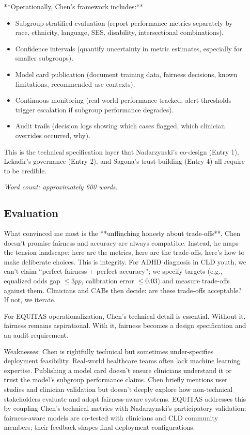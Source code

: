 \documentclass[12pt,twoside]{article}
\DeclareRobustCommand{\pp}{pp\xspace}
\begin{document}
**Operationally, Chen's framework includes:**

\begin{itemize}
\item Subgroup-stratified evaluation (report performance metrics separately by race, ethnicity, language, SES, disability, intersectional combinations).
\item Confidence intervals (quantify uncertainty in metric estimates, especially for smaller subgroups).
\item Model card publication (document training data, fairness decisions, known limitations, recommended use contexts).
\item Continuous monitoring (real-world performance tracked; alert thresholds trigger escalation if subgroup performance degrades).
\item Audit trails (decision logs showing which cases flagged, which clinician overrides occurred, why).
\end{itemize}

This is the technical specification layer that Nadarzynski's co-design (Entry 1), Lekadir's governance (Entry 2), and Sagona's trust-building (Entry 4) all require to be credible.

\emph{Word count: approximately 600 words.}

\subsection*{Evaluation}

What convinced me most is the **unflinching honesty about trade-offs**. Chen doesn't promise fairness and accuracy are always compatible. Instead, he maps the tension landscape: here are the metrics, here are the trade-offs, here's how to make deliberate choices. This is integrity. For ADHD diagnosis in CLD youth, we can't claim ``perfect fairness + perfect accuracy''; we specify targets (e.g., equalized odds gap $\le 3\pp$, calibration error $\le 0.03$) and measure trade-offs against them. Clinicians and CABs then decide: are these trade-offs acceptable? If not, we iterate.

For EQUITAS operationalization, Chen's technical detail is essential. Without it, fairness remains aspirational. With it, fairness becomes a design specification and an audit requirement.

Weaknesses: Chen is rightfully technical but sometimes under-specifies deployment feasibility. Real-world healthcare teams often lack machine learning expertise. Publishing a model card doesn't ensure clinicians understand it or trust the model's subgroup performance claims. Chen briefly mentions user studies and clinician validation but doesn't deeply explore how non-technical stakeholders evaluate and adopt fairness-aware systems. EQUITAS addresses this by coupling Chen's technical metrics with Nadarzynski's participatory validation: fairness-aware models are co-tested with clinicians and CLD community members; their feedback shapes final deployment configurations.
\end{document}
